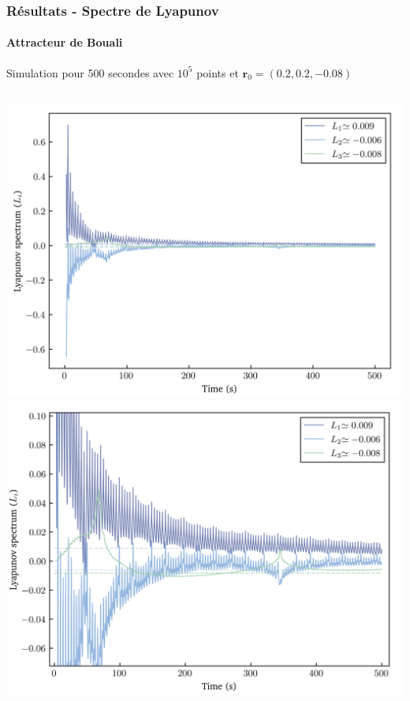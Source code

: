 \begin{frame}
    \frametitle{Résultats - Spectre de Lyapunov}
    \framesubtitle{Attracteur de Bouali}
    Simulation pour 500 secondes avec $10^5$ points et $\bm{r}_0 = (0.2, 0.2, -0.08)$
    \vspace{1cm}
    \begin{columns}
        \centering
        \includegraphics[scale=0.4]{figures/lyapunovs/lyap_bouali.png}
        \includegraphics[scale=0.4]{figures/lyapunovs/lyap_bouali_zoom.png}
    \end{columns}
\end{frame}
